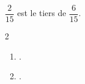 \begin{exercice*}
    $\dfrac{2}{15}$ est le tiers de $\dfrac{6}{15}$.
\end{exercice*}
\begin{corrige}
    \phantom{rrr}    
    \begin{multicols}2
        \begin{enumerate}
            \item .
            \item .
        \end{enumerate}
    \end{multicols}
\end{corrige}

